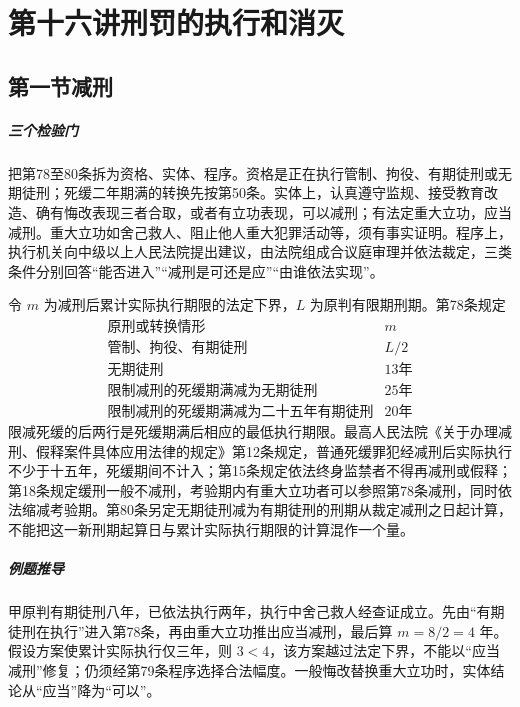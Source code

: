 \chapter{第十六讲\quad 刑罚的执行和消灭}
\label{lecture:16}
\par

\section{第一节\quad 减刑}
\paragraph{三个检验门}
把第78至80条拆为资格、实体、程序。资格是正在执行管制、拘役、有期徒刑或无期徒刑；死缓二年期满的转换先按第50条。实体上，认真遵守监规、接受教育改造、确有悔改表现三者合取，或者有立功表现，可以减刑；有法定重大立功，应当减刑。重大立功如舍己救人、阻止他人重大犯罪活动等，须有事实证明。程序上，执行机关向中级以上人民法院提出建议，由法院组成合议庭审理并依法裁定，三类条件分别回答“能否进入”“减刑是可还是应”“由谁依法实现”。

令 \(m\) 为减刑后累计实际执行期限的法定下界，\(L\) 为原判有限期刑期。第78条规定
\[
\begin{array}{l|l}
\text{原刑或转换情形}&m\\ \hline
\text{管制、拘役、有期徒刑}&L/2\\
\text{无期徒刑}&13\text{年}\\
\text{限制减刑的死缓期满减为无期徒刑}&25\text{年}\\
\text{限制减刑的死缓期满减为二十五年有期徒刑}&20\text{年}
\end{array}
\]
限减死缓的后两行是死缓期满后相应的最低执行期限。最高人民法院《关于办理减刑、假释案件具体应用法律的规定》第12条规定，普通死缓罪犯经减刑后实际执行不少于十五年，死缓期间不计入；第15条规定依法终身监禁者不得再减刑或假释；第18条规定缓刑一般不减刑，考验期内有重大立功者可以参照第78条减刑，同时依法缩减考验期。第80条另定无期徒刑减为有期徒刑的刑期从裁定减刑之日起计算，不能把这一新刑期起算日与累计实际执行期限的计算混作一个量。

\paragraph{例题推导}
甲原判有期徒刑八年，已依法执行两年，执行中舍己救人经查证成立。先由“有期徒刑在执行”进入第78条，再由重大立功推出应当减刑，最后算 \(m=8/2=4\) 年。假设方案使累计实际执行仅三年，则 \(3<4\)，该方案越过法定下界，不能以“应当减刑”修复；仍须经第79条程序选择合法幅度。一般悔改替换重大立功时，实体结论从“应当”降为“可以”。

